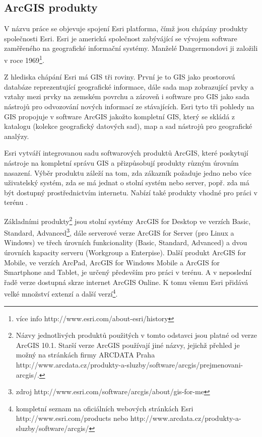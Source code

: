 
\subsection{ArcGIS produkty}

V názvu práce se objevuje spojení Esri platforma, čímž jsou chápány produkty společnosti Esri. Esri je americká společnost zabývájící se vývojem software zaměřeného na geografické informační systémy. Manželé Dangermondovi ji založili v roce 1969\footnote{více info http://www.esri.com/about-esri/history}.

Z hlediska chápání Esri má GIS tři roviny. První je to GIS jako prostorová databáze reprezentující geografické informace, dále sada map zobrazující prvky a vztahy mezi prvky na zemském povrchu a zároveň i software pro GIS jako sada nástrojů pro odvozování nových informací ze stávajících. Esri tyto tři pohledy na GIS propojuje v software ArcGIS jakožto kompletní GIS, který se skládá z katalogu (kolekce geografický datových sad), map a sad nástrojů pro geografické analýzy.

Esri vytváří integrovanou sadu softwarových produktů ArcGIS, které poskytují nástroje na kompletní správu GIS a přizpůsobují produkty různým úrovním nasazení. Výběr produktu záleží na tom, zda zákazník požaduje jedno nebo více uživatelský systém, zda se má jednat o stolní systém nebo server, popř. zda má být dostupný prostřednictvím internetu. Nabízí také produkty vhodné pro práci v terénu \citep{Esri2006}.

Základními produkty\footnote{Názvy jednotlivých produktů použitých v tomto odstavci jsou platné od verze ArcGIS 10.1. Starší verze ArcGIS používají jiné názvy, jejichž přehled je možný na stránkách firmy ARCDATA Praha http://www.arcdata.cz/produkty-a-sluzby/software/arcgis/prejmenovani-arcgis/.} jsou stolní systémy ArcGIS for Desktop ve verzích Basic, Standard, Advanced\footnote{zdroj http://www.esri.com/software/arcgis/about/gis-for-me}, dále serverové verze ArcGIS for Server (pro Linux a Windows) ve třech úrovních funkcionality (Basic, Standard, Advanced) a dvou úrovních kapacity serveru (Workgroup a Enterpise). Další produkt ArcGIS for Mobile, ve verzích ArcPad, ArcGIS for Windows Mobile a ArcGIS for Smartphone and Tablet, je určený především pro práci v terénu. A v neposlední řadě verze dostupná skrze internet ArcGIS Online. K tomu všemu Esri přidává velké množství extenzí a další verzí\footnote{kompletní seznam na oficiálních webových stránkách Esri http://www.esri.com/products nebo http://www.arcdata.cz/produkty-a-sluzby/software/arcgis/}. 

